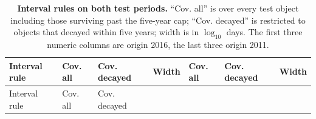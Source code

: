 \documentclass[3p,times]{elsarticle}
\begin{document}
\begin{longtable}[]{@{}
  >{\raggedright\arraybackslash}p{}
  >{\raggedleft\arraybackslash}p{}
  >{\raggedleft\arraybackslash}p{}
  >{\raggedleft\arraybackslash}p{}
  >{\raggedleft\arraybackslash}p{}
  >{\raggedleft\arraybackslash}p{}
  >{\raggedleft\arraybackslash}p{}@{}}
\caption{\textbf{Interval rules on both test periods.} ``Cov. all'' is
over every test object including those surviving past the five-year cap;
``Cov. decayed'' is restricted to objects that decayed within five
years; width is in \(\log_{10}\) days. The first three numeric columns
are origin 2016, the last three origin
2011.}\label{tbl:coverage}\tabularnewline
\toprule\noalign{}
\begin{minipage}[b]{\linewidth}\raggedright
Interval rule
\end{minipage} & \begin{minipage}[b]{\linewidth}\raggedleft
Cov. all
\end{minipage} & \begin{minipage}[b]{\linewidth}\raggedleft
Cov. decayed
\end{minipage} & \begin{minipage}[b]{\linewidth}\raggedleft
Width
\end{minipage} & \begin{minipage}[b]{\linewidth}\raggedleft
Cov. all
\end{minipage} & \begin{minipage}[b]{\linewidth}\raggedleft
Cov. decayed
\end{minipage} & \begin{minipage}[b]{\linewidth}\raggedleft
Width
\end{minipage} \\
\midrule\noalign{}
\endfirsthead
\toprule\noalign{}
\begin{minipage}[b]{\linewidth}\raggedright
Interval rule
\end{minipage} & \begin{minipage}[b]{\linewidth}\raggedleft
Cov. all
\end{minipage} & \begin{minipage}[b]{\linewidth}\raggedleft
Cov. decayed
\end{minipage} & \begin{minipage}[b]{\linewidth}\raggedleft

\end{minipage}
\end{longtable}
\end{document}
